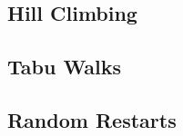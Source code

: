 \documentclass[sigconf, fleqn]{acmart}
\begin{document}
\subsection{Hill Climbing}


\subsection{Tabu Walks}


\subsection{Random Restarts}
\end{document}

